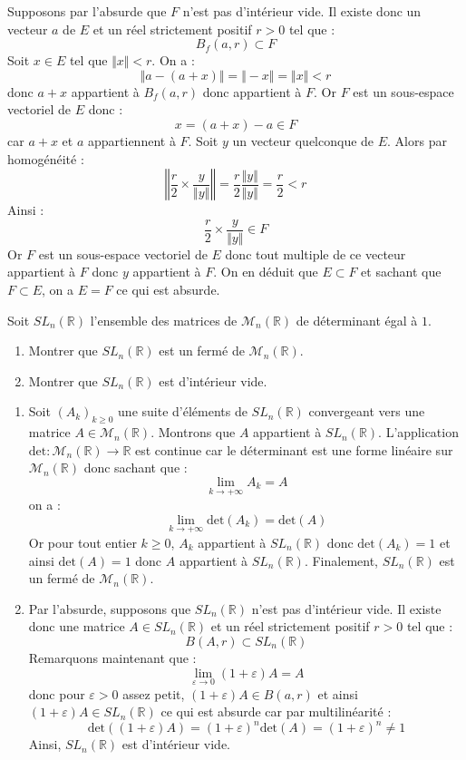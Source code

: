\documentclass[a4paper,10pt]{report}
\begin{document}
\corr Supposons par l'absurde que $F$ n'est pas d'intérieur vide. Il existe donc un vecteur $a$ de $E$ et un réel strictement positif $r>0$ tel que :
$$ B_f(a,r) \subset F$$
Soit $x \in E$ tel que $\Vert x \Vert <r$. On a :
$$ \Vert a-(a+x) \Vert =  \Vert -x \Vert = \Vert x \Vert < r$$
donc $a+x$ appartient à $B_f(a,r)$ donc appartient à $F$. Or $F$ est un sous-espace vectoriel de $E$ donc :
$$ x = (a+x) -a \in F$$
car $a+x$ et $a$ appartiennent à $F$. Soit $y$ un vecteur quelconque de $E$. Alors par homogénéité :
$$ \left\Vert \dfrac{r}{2} \times \dfrac{y}{\Vert y \Vert } \right\Vert  = \dfrac{r}{2} \dfrac{\Vert y \Vert }{\Vert y \Vert } = \dfrac{r}{2} < r$$
Ainsi :
$$ \dfrac{r}{2} \times \dfrac{y}{\Vert y \Vert } \in F$$
Or $F$ est un sous-espace vectoriel de $E$ donc tout multiple de ce vecteur appartient à $F$ donc $y$ appartient à $F$. On en déduit que $E \subset F$ et sachant que $F \subset E$, on a $E=F$ ce qui est absurde.

\begin{Exa} Soit $SL_n(\mathbb{R})$ l'ensemble des matrices de $\mathcal{M}_n(\mathbb{R})$ de déterminant égal à $1$.
\begin{enumerate}
\item Montrer que $SL_n(\mathbb{R})$ est un fermé de $\mathcal{M}_n(\mathbb{R})$.
\item Montrer que $SL_n(\mathbb{R})$ est d'intérieur vide.
\end{enumerate}
\end{Exa}

\corr 

\begin{enumerate}
\item Soit $(A_k)_{k \geq 0}$ une suite d'éléments de $SL_n(\mathbb{R})$ convergeant vers une matrice $A \in \mathcal{M}_n(\mathbb{R})$. Montrons que $A$ appartient à $SL_n(\mathbb{R})$. L'application $\textrm{det} : \mathcal{M}_n(\mathbb{R}) \rightarrow \mathbb{R}$ est continue car le déterminant est une forme linéaire sur $\mathcal{M}_n(\mathbb{R})$ donc sachant que  :
$$ \lim_{k \rightarrow + \infty} A_k = A$$
on a :
$$ \lim_{k \rightarrow + \infty} \textrm{det}(A_k) = \textrm{det}(A)$$
Or pour tout entier $k \geq 0$, $A_k$ appartient à $SL_n(\mathbb{R})$ donc $\textrm{det}(A_k)=1$ et ainsi $\textrm{det}(A)=1$ donc $A$ appartient à $SL_n(\mathbb{R})$. Finalement, $SL_n(\mathbb{R})$ est un fermé de $\mathcal{M}_n(\mathbb{R})$.
\item Par l'absurde, supposons que $SL_n(\mathbb{R})$ n'est pas d'intérieur vide. Il existe donc une matrice $A \in SL_n(\mathbb{R})$ et un réel strictement positif $r>0$ tel que :
$$ B(A,r) \subset SL_n(\mathbb{R})$$
Remarquons maintenant que :
$$ \lim_{\varepsilon \rightarrow 0} (1+ \varepsilon) A= A$$
donc pour $\varepsilon>0$ assez petit, $(1+ \varepsilon) A \in B(a,r)$ et ainsi $(1+ \varepsilon) A \in SL_n(\mathbb{R})$ ce qui est absurde car par multilinéarité : 
$$ \textrm{det}((1+ \varepsilon)A)= (1+\varepsilon)^n \textrm{det}(A) = (1+\varepsilon)^n \neq 1$$
Ainsi, $SL_n(\mathbb{R})$ est d'intérieur vide.
\end{enumerate}
\end{document}
